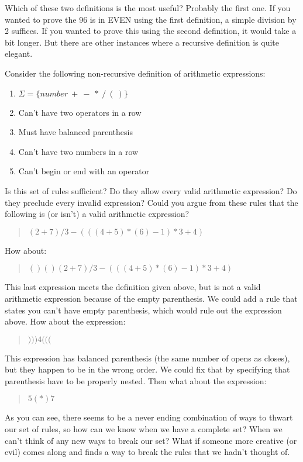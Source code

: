 \documentclass[letterpaper,12pt,openany,reqno]{book}%
\begin{document}
Which of these two definitions is the most useful? Probably the first one. If you wanted to prove the 96 is in EVEN using the first definition, a simple division by 2 suffices. If you wanted to prove this using the second definition, it would take a bit longer. But there are other instances where a recursive definition is quite elegant.

Consider the following non-recursive definition of arithmetic expressions:
\begin{enumerate}
\item $\Sigma = \{ number\ +\ -\ *\ /\ (\ ) \}$
\item Can't have two operators in a row
\item Must have balanced parenthesis
\item Can't have two numbers in a row
\item Can't begin or end with an operator
\end{enumerate}

Is this set of rules sufficient? Do they allow every valid arithmetic expression? Do they preclude every invalid expression? Could you argue from these rules that the following is (or isn't) a valid arithmetic expression?
\begin{quote}
$(2+7)/3-(((4+5)*(6)-1)*3 + 4)$
\end{quote}
How about:
\begin{quote}
$()()(2+7)/3-(((4+5)*(6)-1)*3 + 4)$
\end{quote}
This last expression meets the definition given above, but is not a valid arithmetic expression because of the empty parenthesis. We could add a rule that states you can't have empty parenthesis, which would rule out the expression above. How about the expression:
\begin{quote}
$)))4((($
\end{quote}
This expression has balanced parenthesis (the same number of opens as closes), but they happen to be in the wrong order. We could fix that by specifying that parenthesis have to be properly nested. Then what about the expression:
\begin{quote}
$5(*)7$
\end{quote}
As you can see, there seems to be a never ending combination of ways to thwart our set of rules, so how can we know when we have a complete set? When we can't think of any new ways to break our set? What if someone more creative (or evil) comes along and finds a way to break the rules that we hadn't thought of.
\end{document}
